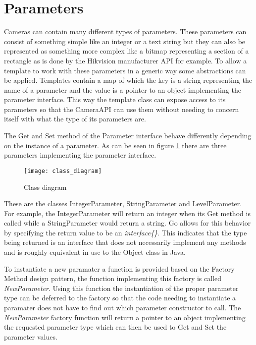 \section{Parameters}
Cameras can contain many different types of parameters.
These parameters can consist of something simple like an integer or a text string but they can also be represented as something more complex like a bitmap representing a section of a rectangle as is done by the Hikvision manufacturer API for example.
 To allow a template to work with these parameters in a generic way some abstractions can be applied.
Templates contain a map of which the key is a string representing the name of a parameter and the value is a pointer to an object implementing the parameter interface.
This way the template class can expose access to its parameters so that the CameraAPI can use them without needing to concern itself with what the type of its parameters are.


The Get and Set method of the Parameter interface behave differently depending on the instance of a parameter.
As can be seen in figure \ref{fig:class_diagram} there are three parameters implementing the parameter interface.

\begin{figure}[h!]
	\centering
	\texttt{[image: class\_diagram]}
	\caption{Class diagram}
	\label{fig:class_diagram}
\end{figure}

These are the classes IntegerParameter, StringParameter and LevelParameter.
For example, the IntegerParameter will return an integer when its Get method is called while a StringParameter would return a string.
Go allows for this behavior by specifying the return value to be an \textit{interface\{\}}.
This indicates that the type being returned is an interface that does not necessarily implement any methods and is roughly equivalent in use to the Object class in Java.

To instantiate a new paramater a function is provided based on the Factory Method design pattern, the function implementing this factory is called \textit{NewParameter}.
Using this function the instantiation of the proper parameter type can be deferred to the factory so that the code needing to instantiate a paramater does not have to find out which parameter constructor to call.
The \textit{NewParameter} factory function will return a pointer to an object implementing the requested parameter type which can then be used to Get and Set the parameter values.

